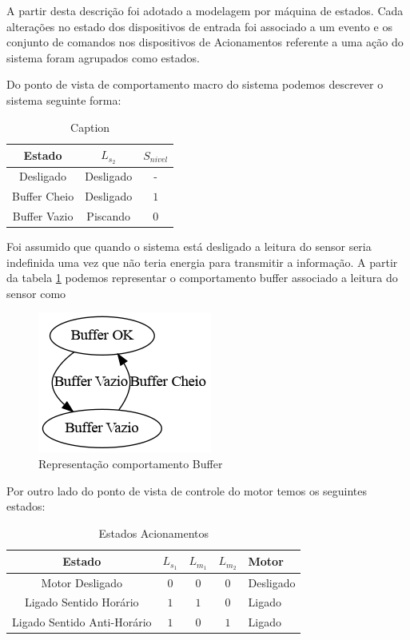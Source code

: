 \documentclass[a4paper,11pt]{article}
\begin{document}
A partir desta descrição foi adotado a modelagem por máquina de estados. Cada alterações no estado dos dispositivos de entrada foi associado a um evento e os conjunto de comandos nos dispositivos de Acionamentos referente a uma ação do sistema foram agrupados como estados.

Do ponto de vista de comportamento macro do sistema podemos descrever o sistema seguinte forma:

\begin{table}[H]
    \centering
    \begin{tabular}{c|cc}
        \hline
        Estado & $L_{s_2}$ & $S_{nivel}$ \\
        \hline
        Desligado & Desligado & - \\
        Buffer Cheio & Desligado & $1$\\
        Buffer Vazio & Piscando & $0$\\
        \hline
    \end{tabular}
    \caption{Caption}
    \label{tab:states_buffer}
\end{table}

Foi assumido que quando o sistema está desligado a leitura do sensor seria indefinida uma vez que não teria energia para transmitir a informação. A partir da tabela \ref{tab:states_buffer} podemos representar o comportamento buffer associado a leitura do sensor como

\begin{figure}[H]
    \centering
    \includegraphics[width=0.4\linewidth]{src/tex/img/automato_buffer.png}
    \caption{Representação comportamento Buffer}
    \label{fig:automato_buffer}
\end{figure}

Por outro lado do ponto de vista de controle do motor temos os seguintes estados:

\begin{table}[H]
    \centering
    \begin{tabular}{c|cccl}
        \hline
        Estado & $L_{s_1}$ & $L_{m_1}$ & $L_{m_2}$ & Motor \\
        \hline
        Motor Desligado & $0$ & $0$ & $0$ & Desligado\\
        Ligado Sentido Horário & $1$ & $1$ & $0$ & Ligado\\
        Ligado Sentido Anti-Horário & $1$ & $0$ & $1$ & Ligado\\
        \hline
    \end{tabular}
    \caption{Estados Acionamentos}
    \label{tab:states_motor}
\end{table}
\end{document}
